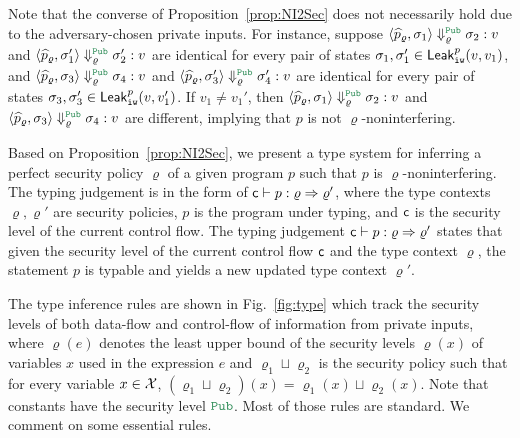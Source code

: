 Note that the converse of Proposition~\ref{prop:NI2Sec} does not necessarily  hold due to
the adversary-chosen private inputs.
For instance, suppose $\MPCAngle{\widehat{p}_\varrho,\sigma_1}\Downarrow_\varrho^{\Pub} \sigma_2:v$
and $\MPCAngle{\widehat{p}_\varrho,\sigma_1'}\Downarrow_\varrho^{\Pub} \sigma_2':v$ are identical
for every pair of states $\sigma_1,\sigma_1'\in {\sf Leak}_{\tt iw}^p(v,v_1)$,
and $\MPCAngle{\widehat{p}_\varrho,\sigma_3}\Downarrow_\varrho^{\Pub} \sigma_4:v$
and $\MPCAngle{\widehat{p}_\varrho,\sigma_3'}\Downarrow_\varrho^{\Pub} \sigma_4':v$ are identical
for every pair of states  $\sigma_3,\sigma_3'\in {\sf Leak}_{\tt iw}^p(v,v_1')$.
If $v_1\neq v_1'$, then $\MPCAngle{\widehat{p}_\varrho,\sigma_1}\Downarrow_\varrho^{\Pub} \sigma_2:v$ and $\MPCAngle{\widehat{p}_\varrho,\sigma_3}\Downarrow_\varrho^{\Pub} \sigma_4:v$
are different, implying that $p$ is not $\varrho$-noninterfering.



Based on Proposition~\ref{prop:NI2Sec},
we present a type system for inferring a perfect security policy $\varrho$ of a given program $p$ such that  $p$ is $\varrho$-noninterfering.
The typing judgement is in the form of ${\sf c}\vdash p:\varrho \Rightarrow \varrho'$, where
the type contexts $\varrho,\varrho'$ are security policies, $p$ is the program under typing,
and ${\sf c}$ is the security level of the current control flow.
The typing judgement ${\sf c}\vdash p:\varrho \Rightarrow \varrho'$
states that given the security level of the current control flow ${\sf c}$ and the type context $\varrho$,
the statement $p$ is typable and yields a new updated type context $\varrho'$.



The type inference rules are shown in Fig.~\ref{fig:type} which track the security levels of
both data-flow and control-flow of information from private inputs, where $\varrho(e)$ denotes the least upper bound of the security levels $\varrho(x)$ of variables $x$ used in the expression $e$
and $\varrho_1 \sqcup\varrho_2$ is the security policy such that for every variable $x\in \mathcal{X}$,
$(\varrho_1 \sqcup\varrho_2)(x)=\varrho_1(x)\sqcup\varrho_2(x)$. Note that constants have the security level
$\Pub$. Most of those rules are standard. We comment on some essential rules.


